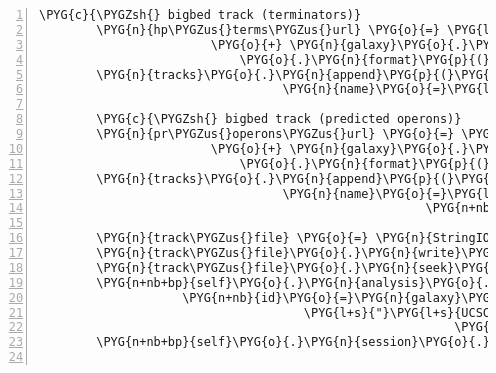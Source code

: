 \begin{Verbatim}[commandchars=\\\{\},numbers=left,firstnumber=1,stepnumber=5]
        \PYG{c}{\PYGZsh{} bigbed track (terminators)}
        \PYG{n}{hp\PYGZus{}terms\PYGZus{}url} \PYG{o}{=} \PYG{l+s}{"}\PYG{l+s}{https://}\PYG{l+s}{"} \PYG{o}{+} \PYG{n}{galaxy}\PYG{o}{.}\PYG{n}{hostname} \PYGZbs{}
                        \PYG{o}{+} \PYG{n}{galaxy}\PYG{o}{.}\PYG{n}{dataset\PYGZus{}display\PYGZus{}url\PYGZus{}template} \PYGZbs{}
                            \PYG{o}{.}\PYG{n}{format}\PYG{p}{(}\PYG{n}{dataset}\PYG{o}{=}\PYG{n+nb+bp}{self}\PYG{o}{.}\PYG{n}{analysis}\PYG{o}{.}\PYG{n}{galaxy\PYGZus{}hp\PYGZus{}terms}\PYG{o}{.}\PYG{n}{id}\PYG{p}{)}
        \PYG{n}{tracks}\PYG{o}{.}\PYG{n}{append}\PYG{p}{(}\PYG{n}{BigBedTrack}\PYG{p}{(}\PYG{n}{url}\PYG{o}{=}\PYG{n}{hp\PYGZus{}terms\PYGZus{}url}\PYG{p}{,}
                                  \PYG{n}{name}\PYG{o}{=}\PYG{l+s}{"}\PYG{l+s}{RNA-Seqlyze \textbar{} }\PYG{l+s+si}{\PYGZpc{}s}\PYG{l+s}{"} \PYG{o}{\PYGZpc{}} \PYG{n+nb+bp}{self}\PYG{o}{.}\PYG{n}{hp\PYGZus{}terms\PYGZus{}name}\PYG{p}{)}\PYG{p}{)}

        \PYG{c}{\PYGZsh{} bigbed track (predicted operons)}
        \PYG{n}{pr\PYGZus{}operons\PYGZus{}url} \PYG{o}{=} \PYG{l+s}{"}\PYG{l+s}{https://}\PYG{l+s}{"} \PYG{o}{+} \PYG{n}{galaxy}\PYG{o}{.}\PYG{n}{hostname} \PYGZbs{}
                        \PYG{o}{+} \PYG{n}{galaxy}\PYG{o}{.}\PYG{n}{dataset\PYGZus{}display\PYGZus{}url\PYGZus{}template} \PYGZbs{}
                            \PYG{o}{.}\PYG{n}{format}\PYG{p}{(}\PYG{n}{dataset}\PYG{o}{=}\PYG{n+nb+bp}{self}\PYG{o}{.}\PYG{n}{analysis}\PYG{o}{.}\PYG{n}{galaxy\PYGZus{}pr\PYGZus{}operons}\PYG{o}{.}\PYG{n}{id}\PYG{p}{)}
        \PYG{n}{tracks}\PYG{o}{.}\PYG{n}{append}\PYG{p}{(}\PYG{n}{BigBedTrack}\PYG{p}{(}\PYG{n}{url}\PYG{o}{=}\PYG{n}{pr\PYGZus{}operons\PYGZus{}url}\PYG{p}{,}
                                  \PYG{n}{name}\PYG{o}{=}\PYG{l+s}{"}\PYG{l+s}{RNA-Seqlyze \textbar{} }\PYG{l+s+si}{\PYGZpc{}s}\PYG{l+s}{"} \PYG{o}{\PYGZpc{}}
                                                      \PYG{n+nb+bp}{self}\PYG{o}{.}\PYG{n}{pr\PYGZus{}operons\PYGZus{}name}\PYG{p}{)}\PYG{p}{)}

        \PYG{n}{track\PYGZus{}file} \PYG{o}{=} \PYG{n}{StringIO}\PYG{p}{(}\PYG{p}{)}
        \PYG{n}{track\PYGZus{}file}\PYG{o}{.}\PYG{n}{write}\PYG{p}{(}\PYG{l+s}{'}\PYG{l+s+se}{\PYGZbs{}n}\PYG{l+s}{'}\PYG{o}{.}\PYG{n}{join}\PYG{p}{(}\PYG{n}{tracks}\PYG{p}{)}\PYG{p}{)}
        \PYG{n}{track\PYGZus{}file}\PYG{o}{.}\PYG{n}{seek}\PYG{p}{(}\PYG{l+m+mi}{0}\PYG{p}{)}
        \PYG{n+nb+bp}{self}\PYG{o}{.}\PYG{n}{analysis}\PYG{o}{.}\PYG{n}{galaxy\PYGZus{}hg\PYGZus{}text} \PYG{o}{=} \PYG{n}{GalaxyDataset}\PYG{p}{(}
                    \PYG{n+nb}{id}\PYG{o}{=}\PYG{n}{galaxy}\PYG{o}{.}\PYG{n}{upload}\PYG{p}{(}\PYG{n}{track\PYGZus{}file}\PYG{p}{,}
                                     \PYG{l+s}{"}\PYG{l+s}{UCSC Tracks Analysis}\PYG{l+s+si}{\PYGZpc{}d}\PYG{l+s}{.txt}\PYG{l+s}{"} \PYG{o}{\PYGZpc{}}
                                                          \PYG{n+nb+bp}{self}\PYG{o}{.}\PYG{n}{analysis}\PYG{o}{.}\PYG{n}{id}\PYG{p}{)}\PYG{p}{)}
        \PYG{n+nb+bp}{self}\PYG{o}{.}\PYG{n}{session}\PYG{o}{.}\PYG{n}{commit}\PYG{p}{(}\PYG{p}{)}


\end{Verbatim}
